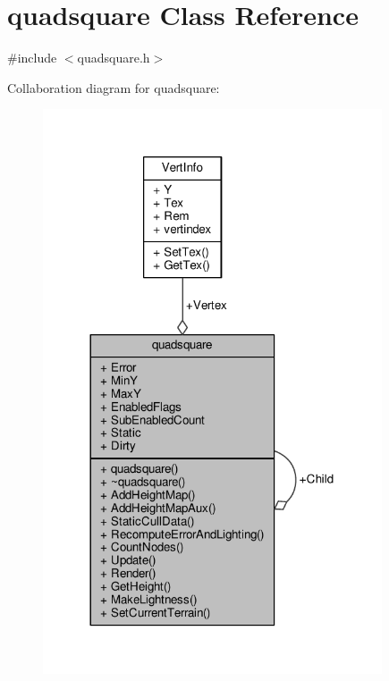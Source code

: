 \hypertarget{classquadsquare}{}\section{quadsquare Class Reference}
\label{classquadsquare}


{\ttfamily \#include $<$quadsquare.\+h$>$}



Collaboration diagram for quadsquare\+:
\nopagebreak
\begin{figure}[H]
\begin{center}
\leavevmode
\includegraphics[width=284pt]{d6/d62/classquadsquare__coll__graph}
\end{center}
\end{figure}
